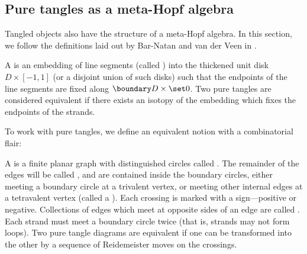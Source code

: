 \subsection{Pure tangles as a meta-Hopf algebra}
\label{sec:topological_interpretations}

Tangled objects also have the structure of a meta-Hopf algebra. In this section,
we follow the definitions laid out by Bar-Natan and van der Veen in \cite{BV}.

\begin{definition}
        A  is an embedding of line segments (called
        ) into the thickened unit disk $D \times [-1,1]$ (or a
        disjoint union of such disks) such that the endpoints of the line
        segments are fixed along $\boundary D \times \set0$. Two pure tangles
        are considered equivalent if there exists an isotopy of the embedding
        which fixes the endpoints of the strands.
\end{definition}

To work with pure tangles, we define an equivalent notion with a combinatorial
flair:

\begin{definition}\label{def:pure_tangle_diagram}
        A  is a finite planar graph with distinguished
        circles called . The remainder of the edges will
        be called , and are contained inside the boundary circles,
        either meeting a boundary circle at a trivalent vertex, or meeting other
        internal edges at a tetravalent vertex (called a ). Each
        crossing is marked with a sign---positive or negative. Collections of
        edges which meet at opposite sides of an edge are called .
        Each strand must meet a boundary circle twice (that is, strands may not
        form loops). Two pure tangle diagrams are equivalent if one can be
        transformed into the other by a sequence of Reidemeister moves on the
        crossings.
\end{definition}

